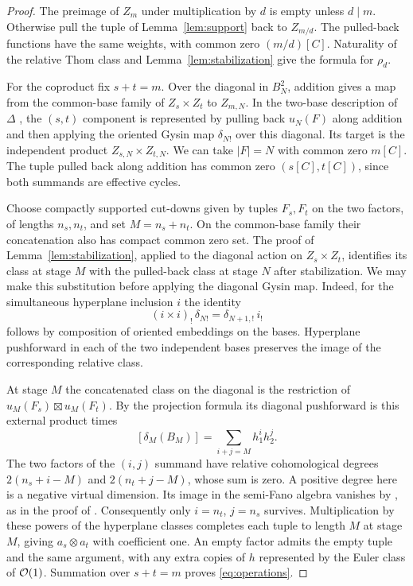 \begin{proof}
The preimage of $Z_m$ under multiplication by $d$ is empty unless
$d\mid m$. Otherwise pull the tuple of Lemma~\ref{lem:support}
back to $Z_{m/d}$. The pulled-back functions have the same weights,
with common zero $(m/d)[C]$. Naturality of the relative Thom class
and Lemma~\ref{lem:stabilization} give the formula for $\rho_d$.

For the coproduct fix $s+t=m$. Over the diagonal in $B_N^2$, addition
gives a map from the common-base family of $Z_s\times Z_t$ to
$Z_{m,N}$. In the two-base description of $\Delta$
\cite[(4.17)--(4.21)]{Pardon}, the $(s,t)$ component is represented
by pulling back $u_N(F)$ along addition and then applying the
oriented Gysin map $\delta_{N!}$ over this diagonal. Its target is
the independent product $Z_{s,N}\times Z_{t,N}$. We can take
$|F|=N$ with common zero $m[C]$. The tuple pulled back along
addition has common zero $(s[C],t[C])$, since both summands are
effective cycles.

Choose compactly supported cut-downs given by tuples $F_s,F_t$ on
the two factors, of lengths $n_s,n_t$, and set $M=n_s+n_t$. On
the common-base family their concatenation also has compact common
zero set. The proof of Lemma~\ref{lem:stabilization}, applied to
the diagonal action on $Z_s\times Z_t$, identifies its class at
stage $M$ with the pulled-back class at stage $N$ after
stabilization. We may make this substitution before applying the
diagonal Gysin map. Indeed, for the simultaneous hyperplane
inclusion $i$ the identity
\[
 (i\times i)_!\,\delta_{N!}=\delta_{N+1,!}\,i_!
\]
follows by composition of oriented embeddings on the bases.
Hyperplane pushforward in each of the two independent bases
preserves the image of the corresponding relative class.

At stage $M$ the concatenated class on the diagonal is the
restriction of $u_M(F_s)\boxtimes u_M(F_t)$. By the projection
formula its diagonal pushforward is this external product times
\[
 [\delta_M(B_M)]=\sum_{i+j=M}h_1^ih_2^j .
\]
The two factors of the $(i,j)$ summand have relative cohomological
degrees $2(n_s+i-M)$ and $2(n_t+j-M)$, whose sum is zero.
A positive degree here is a negative virtual dimension. Its image
in the semi-Fano algebra vanishes by \cite[Theorem~1.2]{Pardon},
as in the proof of \cite[Theorem~7.6]{Pardon}. Consequently only
$i=n_t$, $j=n_s$ survives. Multiplication by these powers of the
hyperplane classes completes each tuple to length $M$ at stage
$M$, giving $a_s\otimes a_t$ with coefficient one.
An empty factor admits the empty tuple and the same argument, with
any extra copies of $h$ represented by the Euler class of
$\mathcal O(1)$. Summation over $s+t=m$ proves \eqref{eq:operations}.
\end{proof}
